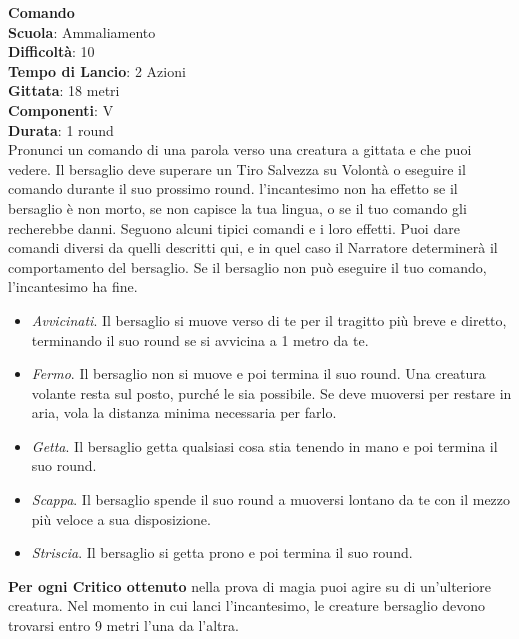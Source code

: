 \begin{multicols}{2}
\medskip\textbf{Comando}\\
\textbf{Scuola}: Ammaliamento\\
\textbf{Difficoltà}:  10\\
\textbf{Tempo di Lancio}: 2 Azioni\\
\textbf{Gittata}: 18 metri\\
\textbf{Componenti}: V\\
\textbf{Durata}: 1 round\\
Pronunci un comando di una parola verso una creatura a gittata e che puoi vedere. Il bersaglio deve superare un Tiro Salvezza su Volontà o eseguire il comando durante il suo prossimo round. l'incantesimo non ha effetto se il bersaglio è non morto, se non capisce la tua lingua, o se il tuo comando gli recherebbe danni. Seguono alcuni tipici comandi e i loro effetti. Puoi dare comandi diversi da quelli descritti qui, e in quel caso il Narratore determinerà il comportamento del bersaglio. Se il bersaglio non può eseguire il tuo comando, l'incantesimo ha fine.
\begin{itemize}
	\item 
\textit{Avvicinati}. Il bersaglio si muove verso di te per il tragitto più breve e diretto, terminando il suo round se si avvicina a 1 metro da te.
	\item 
\textit{Fermo}. Il bersaglio non si muove e poi termina il suo round. Una creatura volante resta sul posto, purché le sia possibile. Se deve muoversi per restare in aria, vola la distanza minima necessaria per farlo.
	\item 
	\textit{Getta}. Il bersaglio getta qualsiasi cosa stia tenendo in mano e poi termina il suo round. 	
	\item  
	\textit{Scappa}. Il bersaglio spende il suo round a muoversi lontano da te con il mezzo più veloce a sua disposizione.
	\item  \textit{Striscia}. Il bersaglio si getta prono e poi termina il suo round.
\end{itemize}

\textbf{Per ogni Critico ottenuto} nella prova di magia puoi agire su di un'ulteriore creatura. Nel momento in cui lanci l'incantesimo, le creature bersaglio devono trovarsi entro 9 metri l’una da l’altra.


\end{multicols}
